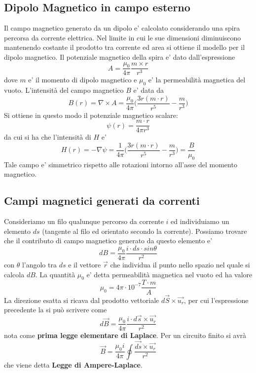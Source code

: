 \documentclass[a4paper, 10pt]{article}
\begin{document}
		\subsection{Dipolo Magnetico in campo esterno}
			Il campo magnetico generato da un dipolo e' calcolato considerando una spira percorsa da corrente elettrica. 
			Nel limite in cui le sue dimensioni diminuiscono mantenendo costante il prodotto tra corrente ed area si ottiene 
			il modello per il dipolo magnetico. Il potenziale magnetico della spira e' dato dall'espressione
			\[ A = \frac{\mu_0}{4\pi} \frac{m \times r}{r^3} \]
			dove $m$ e' il momento di dipolo magnetico e $\mu_0$ e' la permeabilità magnetica del vuoto. 
			L'intensità del campo magnetico $B$ e' data da 
			\[B(r) = \nabla \times A = \frac{\mu_0}{4\pi} \bigl( \frac{3r(m \cdot r)}{r^5} - \frac{m}{r^3} \bigr) \]
			Si ottiene in questo modo il potenziale magnetico scalare: 
			\[ \psi (r) = \frac{m \cdot r}{4\pi r^3} \]
			da cui si ha che l'intensità di $H$ e' 
			\[ H(r) = -\nabla \psi = \frac{1}{4\pi} \bigl( \frac{3r ( m\cdot r) }{r^5} - \frac{m}{r^3} \bigr) = \frac{B}{\mu_0} \]
			Tale campo e' simmetrico rispetto alle rotazioni intorno all'asse del momento magnetico.
		\subsection{Campi magnetici generati da correnti}
			Consideriamo un filo qualunque percorso da corrente $i$ ed individuiamo un elemento $ds$ (tangente al filo ed 
			orientato secondo la corrente). Possiamo trovare che il contributo di campo magnetico generato da questo elemento
			e' \[dB = \frac{\mu_0}{4\pi} \frac{i \cdot ds \cdot sin\theta}{r^2} \] con $\theta$ l'angolo tra $ds$ e il vettore
			$\overrightarrow{r}$ che individua il punto nello spazio nel quale si calcola $dB$. La quantità $\mu_0$ e' 
			detta permeabilità magnetica nel vuoto ed ha valore 
			\[ \mu_0 = 4\pi \cdot 10^{-7} \frac{T \cdot m}{A} \] La direzione esatta si ricava dal prodotto vettoriale 
			$d\overrightarrow{S} \times \overrightarrow{u_r}$, per cui l'espressione precedente la si può scrivere come
			\[ d\overrightarrow{B} = \frac{\mu_0}{4\pi} \frac{i \cdot d\overrightarrow{s} \times \overrightarrow{u_r}}{r^2} \]
			nota come \textbf{prima legge elementare di Laplace}. Per un circuito finito si avrà
			\[ \overrightarrow{B} = \frac{\mu_0 i}{4\pi} \oint {\frac{\overrightarrow{ds} \times \overrightarrow{u_r}}{r^2}} \]
			che viene detta \textbf{Legge di Ampere-Laplace}.
\end{document}
